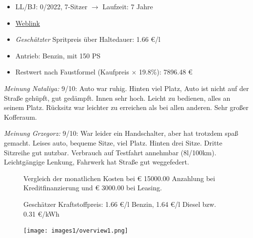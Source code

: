 \documentclass[landscape, DIV=99, 14pt]{scrartcl}
\begin{document}
\begin{itemize}
    \item LL/BJ: 0/2022, 7-Sitzer $\rightarrow$ Laufzeit: 7 Jahre
    \item \href{https://www.volkswagen.de/de/konfigurator.html/__app/touran/touran/comfortline.app?buildabilityStatus-app=buildable&category-app=private&carlineId-app=31000&salesGroupId-app=32600&trimName-app=Comfortline&modelId-app=5T13PZ%24GYORYOR&modelVersion-app=3&modelYear-app=2022&exteriorId-app=F14+5K5K&interiorId-app=F56+++++VE&options-app=MSTD7B2-GPG4PG4-MESSU9C-GPJ9PJ9-GPF6PF6-GPKJPKJ-GPLLPLL-MHKAKH7-GWLLWLL-GWL2WL2-GPM3PM3-GRBDRBD-MTRW3CX-MKSUKA1-MSAB4X4-GP19P19-GWQ1WQ1-GWWCWWC}{Weblink}
    \item \emph{Gesch\"atzter} Spritpreis \"uber Haltedauer: 1.66 \euro{}/l
    \item Antrieb: Benzin, mit 150 PS
    \item Restwert nach Faustformel (Kaufpreis $\times$ 19.8\%): 7896.48 \euro{}
\end{itemize}

\begin{small}
\emph{Meinung Nataliya:} 9/10: Auto war ruhig. Hinten viel Platz, Auto ist nicht auf der Straße gehüpft,
                    gut gedämpft. Innen sehr hoch. Leicht zu bedienen, alles an seinem Platz. Rücksitz
                    war leichter zu erreichen als bei allen anderen. Sehr großer Kofferaum.
        
\emph{Meinung Grzegorz:} 9/10: War leider ein Handschalter, aber hat trotzdem spaß gemacht. 
                   Leises auto, bequeme Sitze, viel Platz. Hinten drei Sitze. Dritte Sitzreihe gut nutzbar.
                   Verbrauch auf Testfahrt annehmbar (8l/100km). Leichtgängige Lenkung, Fahrwerk hat Straße 
                   gut weggefedert.
\end{small}

\pagebreak



\pagebreak

\onecolumn
\begin{figure}
\centering
Vergleich der monatlichen Kosten bei \euro{} 15000.00 Anzahlung bei Kreditfinanzierung und \euro{} 3000.00 bei Leasing.

Gesch\"atzer Kraftstoffpreis: 1.66 \euro{}/l Benzin, 1.64 \euro{}/l Diesel bzw. 0.31 \euro{}/kWh


\vspace{1em}
\texttt{[image: images1/overview1.png]}
\end{figure}
\vfill 
\end{document}
